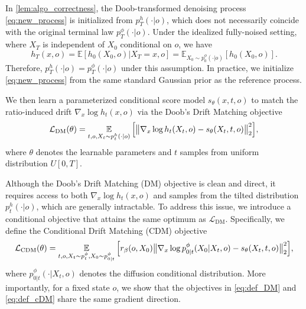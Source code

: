 \begin{remark}[Initialization]
In \cref{lem:algo_correctness}, the Doob-transformed denoising process \eqref{eq:new_process} is initialized from
$p_T^h(\cdot|o)$, which does not necessarily coincide with the original terminal law
$p_T^\phi(\cdot|o)$.
Under the idealized fully-noised setting, where $X_T$ is independent of $X_0$ conditional on $o$, we have
\[
    h_T(x,o)
    =
    \mathbb E[h_0(X_0,o)|X_T=x,o]
    =
    \mathbb E_{X_0\sim p_0^\phi(\cdot|o)}[h_0(X_0,o)].
\]
Therefore, $p_T^h(\cdot|o)=p_T^\phi(\cdot|o)$ under this assumption.
In practice, we initialize \eqref{eq:new_process} from the same standard Gaussian prior as the reference process.
\end{remark}


We then learn a parameterized conditional score model $s_\theta(x,t,o)$ to match the ratio-induced drift $\nabla_x \log h_t(x,o)$ via the Doob's Drift Matching objective
\begin{align}
\label{eq:def_DM}
    \mathcal{L}_{\mathrm{DM}}(\theta)
    =
    \operatorname*{{\mathbb{E}}}_{t, o,X_t \sim p_t^{h}(\cdot|o)}
    \Big[
        \big\|
            \nabla_x \log h_t(X_t,o)
            - s_\theta(X_t,t,o)
        \big\|_2^2
    \Big],
\end{align}
where $\theta$ denotes the learnable parameters and $t$ samples from uniform distribution $U[0,T]$.

Although the Doob's Drift Matching (DM) objective is clean and direct, it requires access to both $\nabla_x \log h_t(x,o)$
and samples from the tilted distribution $p_t^{h}(\cdot|o)$, which are generally intractable.
To address this issue, we introduce a conditional objective that attains the same optimum as $\mathcal{L}_{\mathrm{DM}}$.
Specifically, we define the Conditional Drift Matching (CDM) objective
\begin{align}
\label{eq:def_cDM}
    \mathcal{L}_{\mathrm{CDM}}(\theta)
    =
    \operatorname*{{\mathbb{E}}}_{t,o, X_t \sim p_t^\phi, X_0 \sim p_{0| t}^\phi}
    \Big[
        r_\beta(o,X_0)
        \big\|
            \nabla_x \log p_{0|t}^\phi (X_0| X_t,o)
            - s_\theta(X_t,t,o)
        \big\|_2^2
    \Big],
\end{align}
where $p_{0| t}^\phi(\cdot| X_t,o)$ denotes the diffusion conditional distribution.
More importantly, for a fixed state $o$, we show that the objectives in \eqref{eq:def_DM} and \eqref{eq:def_cDM} share the same gradient direction.


